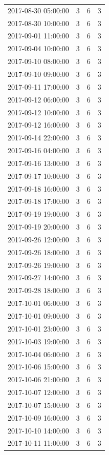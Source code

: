 \begin{tabular}{lrrr}
2017-08-30 05:00:00 & 3 & 6 & 3 \\
2017-08-30 10:00:00 & 3 & 6 & 3 \\
2017-09-01 11:00:00 & 3 & 6 & 3 \\
2017-09-04 10:00:00 & 3 & 6 & 3 \\
2017-09-10 08:00:00 & 3 & 6 & 3 \\
2017-09-10 09:00:00 & 3 & 6 & 3 \\
2017-09-11 17:00:00 & 3 & 6 & 3 \\
2017-09-12 06:00:00 & 3 & 6 & 3 \\
2017-09-12 10:00:00 & 3 & 6 & 3 \\
2017-09-12 16:00:00 & 3 & 6 & 3 \\
2017-09-14 22:00:00 & 3 & 6 & 3 \\
2017-09-16 04:00:00 & 3 & 6 & 3 \\
2017-09-16 13:00:00 & 3 & 6 & 3 \\
2017-09-17 10:00:00 & 3 & 6 & 3 \\
2017-09-18 16:00:00 & 3 & 6 & 3 \\
2017-09-18 17:00:00 & 3 & 6 & 3 \\
2017-09-19 19:00:00 & 3 & 6 & 3 \\
2017-09-19 20:00:00 & 3 & 6 & 3 \\
2017-09-26 12:00:00 & 3 & 6 & 3 \\
2017-09-26 18:00:00 & 3 & 6 & 3 \\
2017-09-26 19:00:00 & 3 & 6 & 3 \\
2017-09-27 14:00:00 & 3 & 6 & 3 \\
2017-09-28 18:00:00 & 3 & 6 & 3 \\
2017-10-01 06:00:00 & 3 & 6 & 3 \\
2017-10-01 09:00:00 & 3 & 6 & 3 \\
2017-10-01 23:00:00 & 3 & 6 & 3 \\
2017-10-03 19:00:00 & 3 & 6 & 3 \\
2017-10-04 06:00:00 & 3 & 6 & 3 \\
2017-10-06 15:00:00 & 3 & 6 & 3 \\
2017-10-06 21:00:00 & 3 & 6 & 3 \\
2017-10-07 12:00:00 & 3 & 6 & 3 \\
2017-10-07 15:00:00 & 3 & 6 & 3 \\
2017-10-09 16:00:00 & 3 & 6 & 3 \\
2017-10-10 14:00:00 & 3 & 6 & 3 \\
2017-10-11 11:00:00 & 3 & 6 & 3 \\

\end{tabular}
